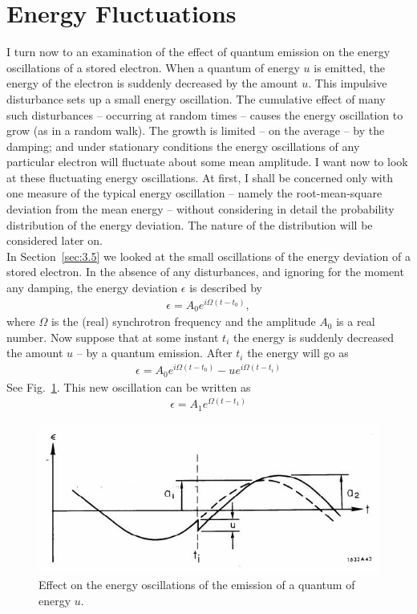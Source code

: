\section{Energy Fluctuations}\label{sec:5.2}

I turn now to an examination of the effect of quantum emission on the energy oscillations of a stored electron. When a quantum of energy $u$ is emitted, the energy of the electron is suddenly decreased by the amount $u$. This impulsive disturbance sets up a small energy oscillation. The cumulative effect of many such disturbances -- occurring at random times -- causes the energy oscillation to grow (as in a random walk). The growth is limited -- on the average -- by the
damping; and under stationary conditions the energy oscillations of any particular electron will fluctuate about some mean amplitude. I want now to look at these fluctuating energy oscillations.
At first, I shall be concerned only with one measure of the typical energy oscillation -- namely the root-mean-square deviation from the mean energy -- without considering in detail the probability distribution of the energy deviation. The nature of the distribution will be considered
 later on.\\
 In Section~\ref{sec:3.5} we looked at the small oscillations of the energy deviation of a stored electron. In the absence of any disturbances, and ignoring for the moment any damping, the energy deviation $\epsilon$ is described by
\begin{align}
	\epsilon = A_0 e^{i \Omega (t - t_0)},
\end{align}
where $\Omega$ is the (real) synchrotron frequency and the amplitude $A_0$ is a real number. Now suppose that at some instant $t_i$ the energy is suddenly decreased the amount $u$ -- by a quantum emission. After $t_i$ the energy will go as
\begin{align}
	\epsilon = A_0 e^{i \Omega (t - t_0)} - u e^{i \Omega (t - t_i)}
\end{align}
See Fig.~\ref{fig:fig43}. This new oscillation can be written as
\begin{align}
	\epsilon = A_1 e^{\Omega (t - t_1)}
\end{align}
\begin{figure}[!htb]
	\centering
	\includegraphics[width=0.8\linewidth]{./Figuras/fig43.jpeg}
	\caption{Effect on the energy oscillations of the emission of a quantum of energy $u$.}
	\label{fig:fig43}
\end{figure}
